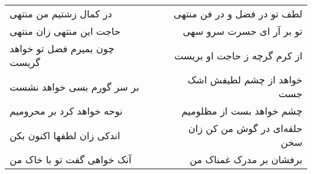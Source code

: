 \begin{center}
\begin{longtable}{l p{0.5cm} r}
در کمال زشتیم من منتهی
&&
لطف تو در فضل و در فن منتهی
\\
حاجت این منتهی زان منتهی
&&
تو بر آر ای حسرت سرو سهی
\\
چون بمیرم فضل تو خواهد گریست
&&
از کرم گرچه ز حاجت او بریست
\\
بر سر گورم بسی خواهد نشست
&&
خواهد از چشم لطیفش اشک جست
\\
نوحه خواهد کرد بر محرومیم
&&
چشم خواهد بست از مظلومیم
\\
اندکی زان لطفها اکنون بکن
&&
حلقه‌ای در گوش من کن زان سخن
\\
آنک خواهی گفت تو با خاک من
&&
برفشان بر مدرک غمناک من
\\
\end{longtable}
\end{center}
